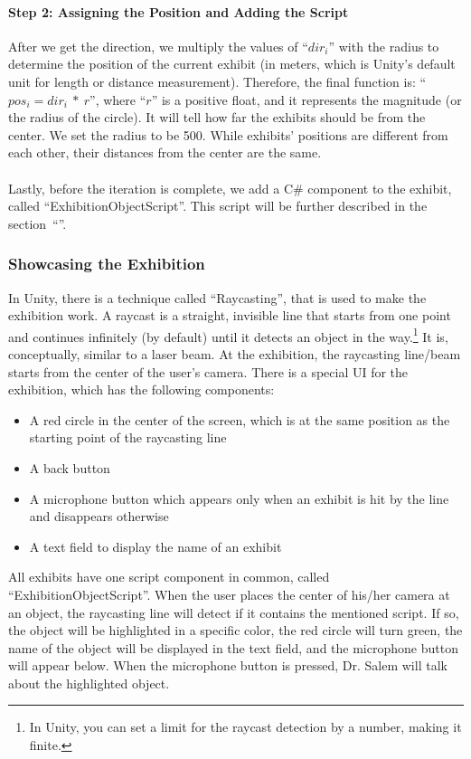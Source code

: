 \paragraph*{Step 2: Assigning the Position and Adding the Script}
After we get the direction, we multiply the values of “$dir_i$” with the radius to determine the position of the current exhibit (in meters, which is Unity’s default unit for length or distance measurement). Therefore, the final function is: “$pos_i = dir_i \ * \ r$”, where “$r$” is a positive float, and it represents the magnitude (or the radius of the circle). It will tell how far the exhibits should be from the center. We set the radius to be 500. While exhibits' positions are different from each other, their distances from the center are the same.
\\ \\
Lastly, before the iteration is complete, we add a C\# component to the exhibit, called “{\codefont ExhibitionObjectScript}”. This script will be further described in the section~“\textbf{}”.

\subsubsection*{Showcasing the Exhibition}
\label{ShowcasingExhibition}
In Unity, there is a technique called “Raycasting”, that is used to make the exhibition work. A raycast is a straight, invisible line that starts from one point and continues infinitely (by default) until it detects an object in the way.\footnote{In Unity, you can set a limit for the raycast detection by a number, making it finite.}  It is, conceptually, similar to a laser beam. At the exhibition, the raycasting line/beam starts from the center of the user’s camera. There is a special \acrshort{UI} for the exhibition, which has the following components:
\begin{itemize}
    \item{A red circle in the center of the screen, which is at the same position as the starting point of the raycasting line}
    
    \item{A back button}
    
    \item{A microphone button which appears only when an exhibit is hit by the line and disappears otherwise}
    
    \item{A text field to display the name of an exhibit}
    
\end{itemize}
All exhibits have one script component in common, called “{\codefont ExhibitionObjectScript}”. When the user places the center of his/her camera at an object, the raycasting line will detect if it contains the mentioned script. If so, the object will be highlighted in a specific color, the red circle will turn green, the name of the object will be displayed in the text field, and the microphone button will appear below. When the microphone button is pressed, Dr. Salem will talk about the highlighted object.

